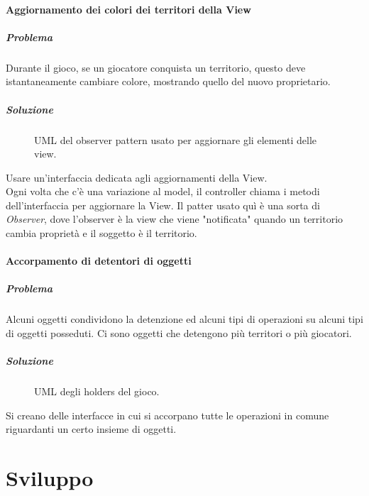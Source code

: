 \documentclass[a4paper,12pt]{report}
\begin{document}
\subsubsection{Aggiornamento dei colori dei territori della View}
\paragraph{Problema}
Durante il gioco, se un giocatore conquista un territorio, questo deve istantaneamente cambiare colore, mostrando quello del nuovo proprietario.
\paragraph{Soluzione}
\begin{figure}[H]
	\centering
	
	\caption{UML del observer pattern usato per aggiornare gli elementi delle view.}
\end{figure}
Usare un'interfaccia dedicata agli aggiornamenti della View.
\\
Ogni volta che c'è una variazione al model, il controller chiama i metodi dell'interfaccia per aggiornare la View.
Il patter usato quì è una sorta di \textit{Observer}, dove l'observer è la view che viene "notificata" quando un territorio cambia proprietà e il soggetto è il territorio.
\subsubsection{Accorpamento di detentori di oggetti}
\paragraph{Problema}
Alcuni oggetti condividono la detenzione ed alcuni tipi di operazioni su alcuni tipi di oggetti posseduti.
Ci sono oggetti che detengono più territori o più giocatori.
\paragraph{Soluzione}
\begin{figure}[H]
	\centering
	
	\caption{UML degli holders del gioco.}
\end{figure}
Si creano delle interfacce in cui si accorpano tutte le operazioni in comune riguardanti un certo insieme di oggetti.

\chapter{Sviluppo}
\end{document}
